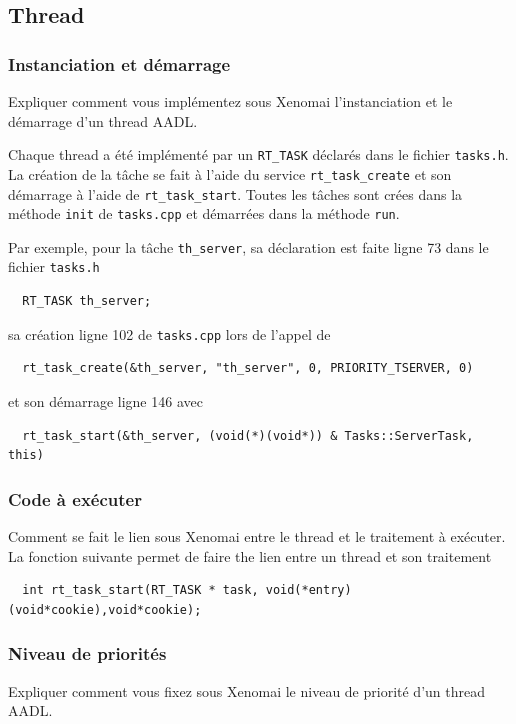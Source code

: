 \documentclass[11pt, a4paper]{paper}
\begin{document}
{{ %
\subsection{Thread}
\subsubsection{Instanciation et démarrage}
 {\color{blue} Expliquer comment vous implémentez sous Xenomai l'instanciation et le démarrage d'un  thread AADL.}
 
 {\color{black} {Chaque thread a été implémenté par un {\tt RT\_TASK} déclarés dans le fichier {\tt tasks.h}. La création de la tâche se fait à l'aide du service {\tt rt\_task\_create} et son démarrage à l'aide de {\tt rt\_task\_start}. Toutes les tâches sont crées dans la méthode {\tt init} de {\tt tasks.cpp} et démarrées dans la méthode {\tt run}.

Par exemple, pour la tâche {\tt th\_server}, sa déclaration est faite ligne 73 dans le fichier {\tt tasks.h}
\begin{verbatim}
  RT_TASK th_server;
\end{verbatim}
sa création ligne 102 de {\tt tasks.cpp} lors de l'appel de
\begin{verbatim}
  rt_task_create(&th_server, "th_server", 0, PRIORITY_TSERVER, 0)
\end{verbatim}
et son démarrage ligne 146 avec
\begin{verbatim}
  rt_task_start(&th_server, (void(*)(void*)) & Tasks::ServerTask, this)
\end{verbatim}
}

\subsubsection{Code à exécuter}
 {\color{blue} Comment se fait le lien sous Xenomai entre le thread et le traitement à exécuter.}\\
 
 {\color{black} La fonction suivante permet de faire the lien entre un thread et son traitement}
\begin{verbatim}
  int rt_task_start(RT_TASK * task, void(*entry)(void*cookie),void*cookie);
\end{verbatim}
 

\subsubsection{Niveau de priorités}
 {\color{blue} Expliquer comment vous fixez sous Xenomai le niveau de priorité d'un thread AADL.}\\
 
}}}
\end{document}
